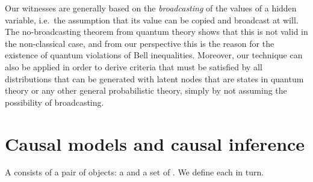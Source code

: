 Our witnesses are generally based on the \emph{broadcasting} of the values of a hidden variable, i.e.~the assumption that its value can be copied and broadcast at will. The no-broadcasting theorem from quantum theory shows that this is not valid in the non-classical case, and from our perspective this is the reason for the existence of quantum violations of Bell inequalities. Moreover, our technique can also be applied in order to derive criteria that must be satisfied by all distributions that can be generated with latent nodes that are states in quantum theory or any other general probabilistic theory, simply by not assuming the possibility of broadcasting.

\section{Causal models and causal inference}\label{sec:definitions}




A  consists of a pair of objects: a  and a set of .  We define each in turn.

